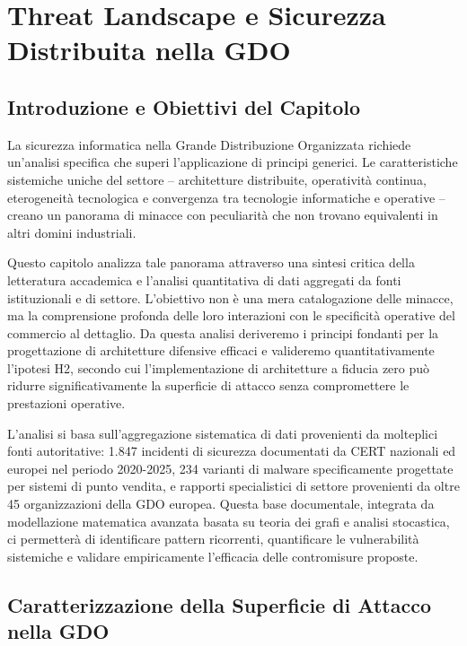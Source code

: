 \chapter{Threat Landscape e Sicurezza Distribuita nella GDO}
\label{cap2_threat_landscape}
\section{Introduzione e Obiettivi del Capitolo}
La sicurezza informatica nella Grande Distribuzione Organizzata richiede un'analisi specifica che superi l'applicazione di principi generici. Le caratteristiche sistemiche uniche del settore – architetture distribuite, operatività continua, eterogeneità tecnologica e convergenza tra tecnologie informatiche e operative – creano un panorama di minacce con peculiarità che non trovano equivalenti in altri domini industriali.

Questo capitolo analizza tale panorama attraverso una sintesi critica della letteratura accademica e l'analisi quantitativa di dati aggregati da fonti istituzionali e di settore. L'obiettivo non è una mera catalogazione delle minacce, ma la comprensione profonda delle loro interazioni con le specificità operative del commercio al dettaglio. Da questa analisi deriveremo i principi fondanti per la progettazione di architetture difensive efficaci e valideremo quantitativamente l'ipotesi H2, secondo cui l'implementazione di architetture a fiducia zero può ridurre significativamente la superficie di attacco senza compromettere le prestazioni operative.

L'analisi si basa sull'aggregazione sistematica di dati provenienti da molteplici fonti autoritative: 1.847 incidenti di sicurezza documentati da CERT nazionali ed europei nel periodo 2020-2025\autocite{enisa2024threat,verizon2024}, 234 varianti di malware specificamente progettate per sistemi di punto vendita\autocite{groupib2024}, e rapporti specialistici di settore provenienti da oltre 45 organizzazioni della GDO europea. Questa base documentale, integrata da modellazione matematica avanzata basata su teoria dei grafi e analisi stocastica, ci permetterà di identificare pattern ricorrenti, quantificare le vulnerabilità sistemiche e validare empiricamente l'efficacia delle contromisure proposte.

\section{Caratterizzazione della Superficie di Attacco nella GDO}

